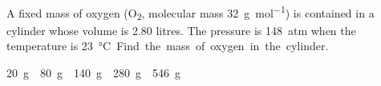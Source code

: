 \documentclass{../../oss-apphys-exam}
\begin{document}
\begin{questions}
  
  \question A fixed mass of oxygen (O\textsubscript{2}, molecular mass
  \SI{32}{\gram\per\mol}) is contained in a cylinder whose volume is 2.80
  litres. The pressure is \SI{148}{atm} when the temperature is
  \SI{23}\celsius. Find the mass of oxygen in the cylinder.
  \begin{choices}
    \choice\SI{20}\gram
    \choice\SI{80}\gram
    \choice\SI{140}\gram
    \choice\SI{280}\gram
    \choice\SI{546}\gram
  \end{choices}

  \classkickFRQinstructions
  

\end{questions}
\end{document}
